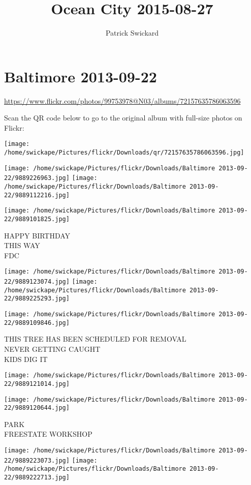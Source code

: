 \documentclass[10pt,letterpaper]{article}
\title{Ocean City 2015-08-27}
\author{Patrick Swickard}
\date{}
\begin{document}
\section*{Baltimore 2013-09-22}

\url{https://www.flickr.com/photos/99753978@N03/albums/72157635786063596}

Scan the QR code below to go to the original album with full-size photos on Flickr:

\texttt{[image: /home/swickape/Pictures/flickr/Downloads/qr/72157635786063596.jpg]}
\pagebreak

\texttt{[image: /home/swickape/Pictures/flickr/Downloads/Baltimore 2013-09-22/9889226963.jpg]}
\texttt{[image: /home/swickape/Pictures/flickr/Downloads/Baltimore 2013-09-22/9889112216.jpg]}

\vspace{0.25in}
\texttt{[image: /home/swickape/Pictures/flickr/Downloads/Baltimore 2013-09-22/9889101825.jpg]}

HAPPY BIRTHDAY\\
THIS WAY\\
FDC
\pagebreak

\texttt{[image: /home/swickape/Pictures/flickr/Downloads/Baltimore 2013-09-22/9889123074.jpg]}
\texttt{[image: /home/swickape/Pictures/flickr/Downloads/Baltimore 2013-09-22/9889225293.jpg]}

\texttt{[image: /home/swickape/Pictures/flickr/Downloads/Baltimore 2013-09-22/9889109846.jpg]}

THIS TREE HAS BEEN SCHEDULED FOR REMOVAL\\
NEVER GETTING CAUGHT\\
KIDS DIG IT
\pagebreak

\texttt{[image: /home/swickape/Pictures/flickr/Downloads/Baltimore 2013-09-22/9889121014.jpg]}

\vspace{0.25in}
\texttt{[image: /home/swickape/Pictures/flickr/Downloads/Baltimore 2013-09-22/9889120644.jpg]}

PARK\\
FREESTATE WORKSHOP
\pagebreak

\texttt{[image: /home/swickape/Pictures/flickr/Downloads/Baltimore 2013-09-22/9889223073.jpg]}
\texttt{[image: /home/swickape/Pictures/flickr/Downloads/Baltimore 2013-09-22/9889222713.jpg]}
\end{document}
